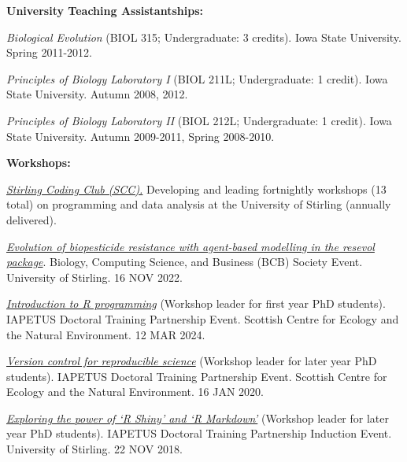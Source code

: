 \documentclass[letterpaper]{article}
\renewenvironment{itemize}{
  \begin{list}{}{
    \setlength{\leftmargin}{1.5em}
  }
}{
  \end{list}
}
\begin{document}
\begin{itemize}
\item {\bf University Teaching Assistantships:}
\begin{itemize}
\item[$\bullet$]{{\it Biological Evolution} (BIOL 315; Undergraduate: 3 credits). Iowa State University. Spring 2011-2012.}
\item[$\bullet$]{{\it Principles of Biology Laboratory I} (BIOL 211L; Undergraduate: 1 credit). Iowa State University. Autumn 2008, 2012.}
\item[$\bullet$]{{\it Principles of Biology Laboratory II} (BIOL 212L; Undergraduate: 1 credit). Iowa State University. Autumn 2009-2011, Spring 2008-2010.}
\end{itemize}

\item {\bf Workshops:}
\begin{itemize}
\item[$\bullet$]{{\it \href{https://stirlingcodingclub.github.io/studyGroup}{Stirling Coding Club (SCC).}} Developing and leading fortnightly workshops (13 total) on programming and data analysis at the University of Stirling (annually delivered).}
\item[$\bullet$]{{\it \href{http://bradduthie.github.io/talks/BCB_talk.pdf}{Evolution of biopesticide resistance with
agent-based modelling in the resevol package}}. Biology, Computing Science, and Business (BCB) Society Event. University of Stirling. 16 NOV 2022.}
\item[$\bullet$]{{\it \href{http://bradduthie.github.io/notes/R_intro_notes.html}{Introduction to R programming}} (Workshop leader for first year PhD students). IAPETUS Doctoral Training Partnership Event. Scottish Centre for Ecology and the Natural Environment. 12 MAR 2024.}
\item[$\bullet$]{{\it \href{https://bradduthie.github.io/version_control/vc_notes.html}{Version control for reproducible science}} (Workshop leader for later year PhD students). IAPETUS Doctoral Training Partnership Event. Scottish Centre for Ecology and the Natural Environment. 16 JAN 2020.}
\item[$\bullet$]{{\it \href{https://bradduthie.github.io/blog/Manuscripts-in-Rmarkdown/}{Exploring the power of `R Shiny' and `R Markdown'}} (Workshop leader for later year PhD students). IAPETUS Doctoral Training Partnership Induction Event. University of Stirling. 22 NOV 2018.}
\end{itemize}

\end{itemize}
\end{document}
